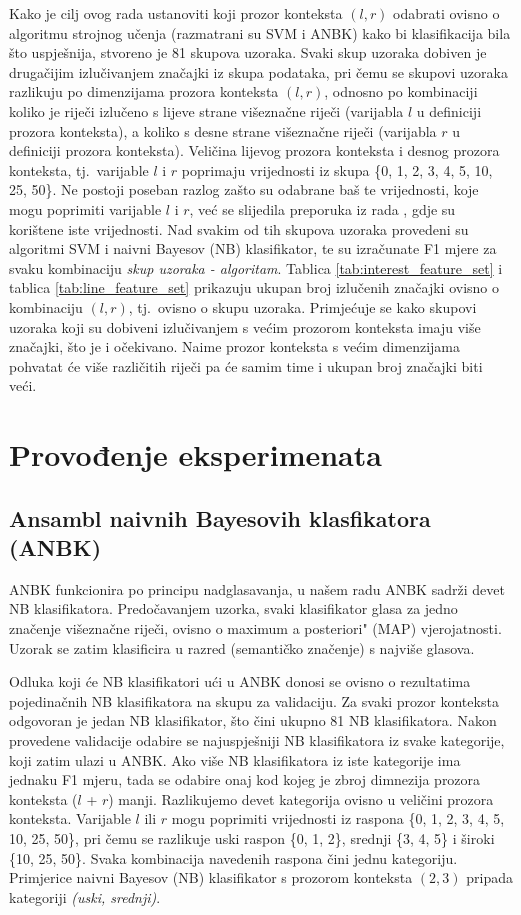 \documentclass[10pt, a4paper]{article}
\begin{document}
Kako je cilj ovog rada ustanoviti koji prozor konteksta $(l,r)$ odabrati
ovisno o algoritmu strojnog učenja (razmatrani su SVM i ANBK)
kako bi klasifikacija bila što uspješnija, stvoreno je 81 skupova uzoraka. Svaki
skup uzoraka dobiven je drugačijim izlučivanjem značajki iz skupa podataka,
pri čemu se skupovi uzoraka razlikuju po dimenzijama prozora konteksta $(l, r)$,
odnosno po kombinaciji koliko je riječi izlučeno s lijeve strane višeznačne riječi (varijabla $l$ u definiciji prozora konteksta), a koliko s desne strane višeznačne riječi (varijabla $r$ u definiciji prozora konteksta). Veličina lijevog prozora konteksta i desnog prozora konteksta, tj.~varijable
$l$ i $r$ poprimaju vrijednosti iz skupa \{0, 1, 2, 3, 4, 5, 10, 25, 50\}. Ne postoji poseban
razlog zašto su odabrane baš te vrijednosti, koje mogu poprimiti varijable $l$ i $r$,
već se slijedila preporuka iz rada \citep{pedersen}, gdje su korištene iste vrijednosti.
Nad svakim od tih skupova uzoraka provedeni su algoritmi SVM i naivni Bayesov (NB) klasifikator, te su izračunate F1 mjere za svaku kombinaciju \emph{skup uzoraka - algoritam}.
Tablica \ref{tab:interest_feature_set} i tablica \ref{tab:line_feature_set} prikazuju ukupan broj izlučenih značajki ovisno o kombinaciju $(l,r)$, tj.~ovisno o skupu uzoraka. Primjećuje
se kako skupovi uzoraka koji su dobiveni izlučivanjem s većim prozorom konteksta imaju
više značajki, što je i očekivano. Naime prozor konteksta s većim dimenzijama pohvatat će više 
različitih riječi pa će samim time i ukupan broj značajki biti veći.

\section{Provođenje eksperimenata}
\subsection{Ansambl naivnih Bayesovih klasfikatora (ANBK)}
ANBK funkcionira po principu nadglasavanja, u našem radu ANBK sadrži devet NB klasifikatora.
Predočavanjem uzorka, svaki klasifikator glasa za jedno značenje višeznačne riječi, 
ovisno o \grqq maximum a posteriori" (MAP) vjerojatnosti. Uzorak se 
zatim klasificira u razred (semantičko značenje) s najviše glasova.

Odluka koji će NB klasifikatori ući u ANBK donosi se ovisno o rezultatima pojedinačnih
NB klasifikatora na skupu za validaciju.
Za svaki prozor konteksta odgovoran je jedan
NB klasifikator, što čini ukupno 81 NB klasifikatora. 
Nakon provedene validacije odabire se najuspješniji NB klasifikatora
iz svake kategorije, koji zatim ulazi u ANBK. Ako više NB klasifikatora iz
iste kategorije ima jednaku F1 mjeru, tada se odabire onaj kod kojeg
je zbroj dimnezija prozora konteksta ($l$ + $r$) manji.
Razlikujemo devet kategorija ovisno u veličini prozora konteksta.
Varijable $l$ ili $r$ mogu poprimiti vrijednosti iz raspona \{0, 1, 2, 3, 4, 5, 10, 25, 50\},
pri čemu se razlikuje uski raspon \{0, 1, 2\}, srednji \{3, 4, 5\} i široki \{10, 25, 50\}.
Svaka kombinacija navedenih raspona čini jednu kategoriju. Primjerice
naivni Bayesov (NB) klasifikator s prozorom konteksta $(2,3)$ pripada kategoriji \emph{(uski, srednji)}.
\end{document}
